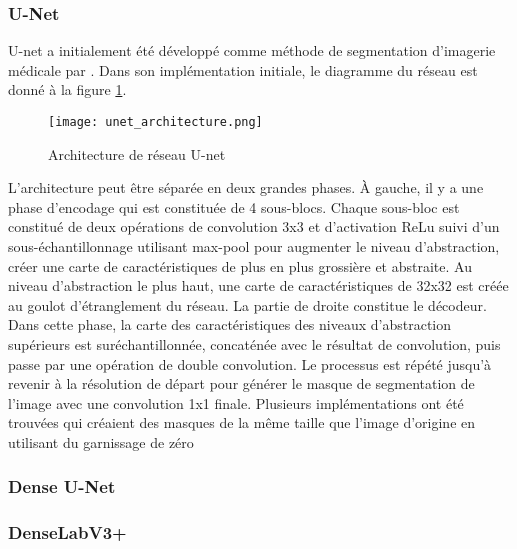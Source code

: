   \subsubsection{U-Net}
    U-net a initialement été développé comme méthode de segmentation d'imagerie médicale par \textcite{Ronneberger:UNetConvolutional:2015}. Dans son implémentation initiale, le diagramme du réseau est donné à la figure \ref{fig:unet_arch}.
    \begin{figure}[!h]
      \centering
      \texttt{[image: unet\_architecture.png]}
      \caption{Architecture de réseau U-net \parencite{Ronneberger:UNetConvolutional:2015}}
      \label{fig:unet_arch}
    \end{figure}
    L'architecture peut être séparée en deux grandes phases. À gauche, il y a une phase d'encodage qui est constituée de 4 sous-blocs. Chaque sous-bloc est constitué de deux opérations de convolution 3x3 et d'activation \ac{ReLu} suivi d'un sous-échantillonnage utilisant max-pool pour augmenter le niveau d'abstraction, créer une carte de caractéristiques de plus en plus grossière et abstraite. Au niveau d'abstraction le plus haut, une carte de caractéristiques de 32x32 est créée au goulot d'étranglement du réseau. La partie de droite constitue le décodeur. Dans cette phase, la carte des caractéristiques des niveaux d'abstraction supérieurs est suréchantillonnée, concaténée avec le résultat de convolution, puis passe par une opération de double convolution. Le processus est répété jusqu'à revenir à la résolution de départ pour générer le masque de segmentation de l'image avec une convolution 1x1 finale. Plusieurs implémentations ont été trouvées qui créaient des masques de la même taille que l'image d'origine en utilisant du garnissage de zéro 
  \subsubsection{Dense U-Net}

  \subsubsection{DenseLabV3+}

